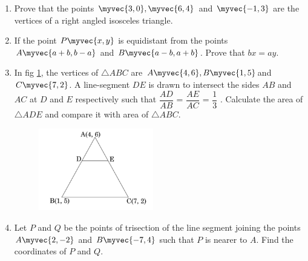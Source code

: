 \begin{enumerate}
\item  Prove that the points $\myvec{3,0}, \myvec{6, 4}$ and $\myvec{-1, 3}$ are the vertices of a right angled isosceles triangle.\\
\item  If the point $P\myvec{x, y}$ is equidistant from the points $A\myvec{a+b, b-a}$ and $B\myvec{a-b, a+b}$. Prove that $bx=ay$.\\
\item In fig \ref{figure_1}, the vertices of $\triangle ABC$ are $A\myvec{4, 6}, B\myvec{1, 5}$and $C\myvec{7, 2}$. A line-segment $DE$ is drawn to intersect the sides $AB$ and $AC$ at $D$ and $E$ respectively such that $\dfrac{AD}{AB}$ = $\dfrac{AE}{AC}$ = $\dfrac{1}{3}$ . Calculate the area of $ \triangle ADE$ and compare it with area of $ \triangle ABC$.\\
	\begin{figure}[H]
      \centering
      \includegraphics[width=5cm]{figs/2016_10_8.png}
     \caption{}
      \label{figure_1}
\end{figure} 
\item  Let $P$ and $Q$ be the points of trisection of the line segment joining the points $A\myvec{2,-2}$ and $B\myvec{-7, 4}$ such that $P$ is nearer to $A$. Find the coordinates of $P$ and $Q$.
\end{enumerate}

